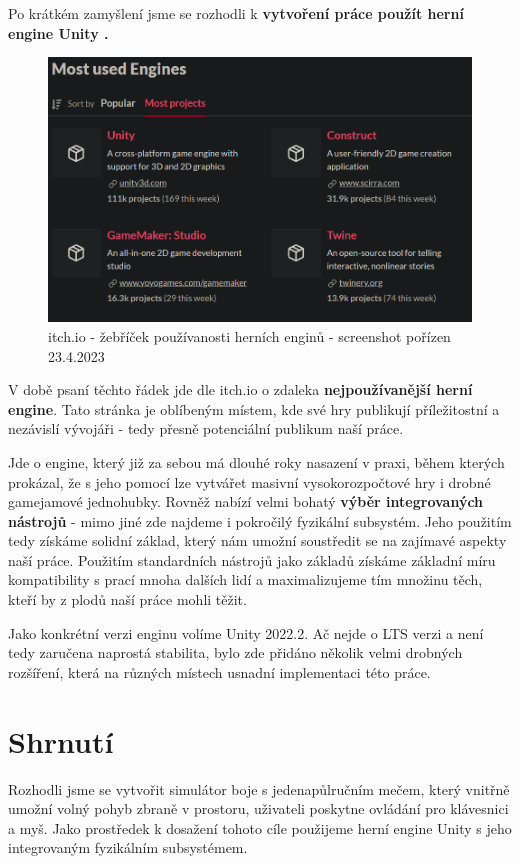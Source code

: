 \bigbreak
Po krátkém zamyšlení jsme se rozhodli k \textbf{vytvoření práce použít herní engine Unity \cite{Unity}.} 
\begin{figure}[h]\centering
    \center
    \includegraphics[width=140mm]{../img/Itch-mostUsedEngines.png}
    \caption{itch.io - žebříček používanosti herních enginů - screenshot pořízen 23.4.2023}
    \label{obr02:itchIoEngines}
    
\end{figure}

V době psaní těchto řádek jde dle itch.io \cite{ItchIo} o zdaleka \textbf{nejpoužívanější herní engine}. Tato stránka je oblíbeným místem, kde své hry publikují příležitostní a nezávislí vývojáři - tedy přesně potenciální publikum naší práce. 

Jde o engine, který již za sebou má dlouhé roky nasazení v praxi, během kterých prokázal, že s jeho pomocí lze vytvářet masivní vysokorozpočtové hry i drobné gamejamové jednohubky. Rovněž nabízí velmi bohatý \textbf{výběr integrovaných nástrojů} - mimo jiné zde najdeme i pokročilý fyzikální subsystém. Jeho použitím tedy získáme solidní základ, který nám umožní soustředit se na zajímavé aspekty naší práce. Použitím standardních nástrojů jako základů získáme základní míru kompatibility s prací mnoha dalších lidí a maximalizujeme tím množinu těch, kteří by z plodů naší práce mohli těžit.

Jako konkrétní verzi enginu volíme Unity 2022.2. Ač nejde o \acs{LTS} verzi a není tedy zaručena naprostá stabilita, bylo zde přidáno několik velmi drobných rozšíření, která na různých místech usnadní implementaci této práce.  

\section{Shrnutí}
Rozhodli jsme se vytvořit simulátor boje s jedenapůlručním mečem, který vnitřně umožní volný pohyb zbraně v prostoru, uživateli poskytne ovládání pro klávesnici a myš. Jako prostředek k dosažení tohoto cíle použijeme herní engine Unity \cite{Unity} s jeho integrovaným fyzikálním subsystémem. 
